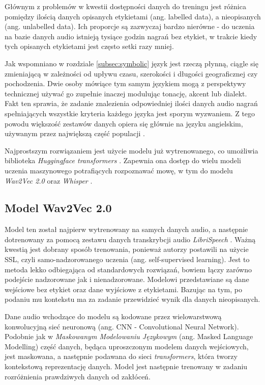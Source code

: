 Głównym z problemów w kwestii dostępności danych do treningu jest różnica pomiędzy ilością danych opisanych etykietami (ang. labelled data), a nieopisanych (ang. unlabelled data). Ich proporcje są zazwyczaj bardzo nierówne - do uczenia na bazie danych audio istnieją tysiące godzin nagrań bez etykiet, w trakcie kiedy tych opisanych etykietami jest często setki razy mniej. 

Jak wspomniano w rozdziale \ref{subsec:symbolic} język jest rzeczą płynną, ciągle się zmieniającą w zależności od upływu czasu, szerokości i długości geograficznej czy pochodzenia. Dwie osoby mówiące tym samym językiem mogą z perspektywy technicznej używać go zupełnie inaczej modulując tonację, akcent lub dialekt. Fakt ten sprawia, że zadanie znalezienia odpowiedniej ilości danych audio nagrań spełniających wszystkie kryteria każdego języka jest sporym wyzwaniem. Z tego powodu większość zestawów danych opiera się głównie na języku angielskim, używanym przez największą część populacji \cite{mostspoken}. 

Najprostszym rozwiązaniem jest użycie modelu już wytrenowanego, co umożliwia biblioteka \textit{Huggingface transformers} \cite{hf}. Zapewnia ona dostęp do wielu modeli uczenia maszynowego potrafiących rozpoznawać mowę, w tym do modelu \textit{Wav2Vec 2.0} \cite{bvski} oraz \textit{Whisper} \cite{radfort}.


\subsection{Model Wav2Vec 2.0}
\label{subsec:wav2vec}

Model ten został najpierw wytrenowany na samych danych audio, a następnie dotrenowany za pomocą zestawu danych transkrybcji audio \textit{LibriSpeech} \cite{libri}. Ważną kwestią jest dobrany sposób trenowania, ponieważ autorzy postawili na użycie SSL, czyli samo-nadzorowanego uczenia (ang. self-supervised learning). Jest to metoda lekko odbiegająca od standardowych rozwiązań, bowiem łączy zarówno podejście nadzorowane jak i nienadzorowane. Modelowi przedstawiane są dane wejściowe bez etykiet oraz dane wyjściowe z etykietami. Bazując na tym, po podaniu mu kontekstu ma za zadanie przewidzieć wynik dla danych nieopisanych. 

Dane audio wchodzące do modelu są kodowane przez wielowarstwową konwolucyjną sieć neuronową (ang. CNN - Convolutional Neural Network). Podobnie jak w \textit{Maskowanym Modelowaniu Językowym} (ang. Masked Language Modelling) część danych, będąca uproszczonym modelem danych wejściowych, jest maskowana, a następnie podawana do sieci \textit{transformers}, która tworzy kontekstową reprezentację danych. Model jest następnie trenowany w zadaniu rozróżnienia prawdziwych danych od zakłóceń. 

